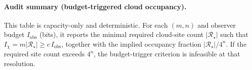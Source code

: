 \paragraph{Audit summary (budget-triggered cloud occupancy).} \AuditTag This table is capacity-only and deterministic. For each $(m,n)$ and observer budget $I_{\mathrm{obs}}$ (bits), it reports the minimal required cloud-site count $|\mathcal R_\star|$ such that $I_{\chi}=m|\mathcal R_\star|\ge c\,I_{\mathrm{obs}}$, together with the implied occupancy fraction $|\mathcal R_\star|/4^n$. If the required site count exceeds $4^n$, the budget-trigger criterion is infeasible at that resolution.